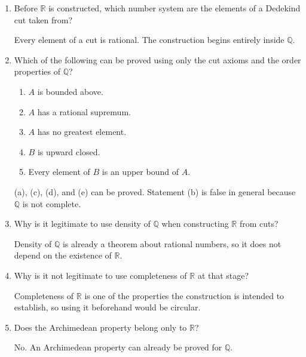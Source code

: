 \documentclass{self-check}
\begin{document}
\begin{enumerate}[label=\arabic*., itemsep=10pt]

\item Before $\mathbb{R}$ is constructed, which number system are the elements of a Dedekind cut taken from?

\begin{answer}
Every element of a cut is rational. The construction begins entirely inside $\mathbb{Q}$.
\end{answer}

\item Which of the following can be proved using only the cut axioms and the order properties of $\mathbb{Q}$?
\begin{enumerate}[label=(\alph*)]
\item $A$ is bounded above.
\item $A$ has a rational supremum.
\item $A$ has no greatest element.
\item $B$ is upward closed.
\item Every element of $B$ is an upper bound of $A$.
\end{enumerate}

\begin{answer}
(a), (c), (d), and (e) can be proved. Statement (b) is false in general because $\mathbb{Q}$ is not complete.
\end{answer}

\item Why is it legitimate to use density of $\mathbb{Q}$ when constructing $\mathbb{R}$ from cuts?

\begin{answer}
Density of $\mathbb{Q}$ is already a theorem about rational numbers, so it does not depend on the existence of $\mathbb{R}$.
\end{answer}

\item Why is it not legitimate to use completeness of $\mathbb{R}$ at that stage?

\begin{answer}
Completeness of $\mathbb{R}$ is one of the properties the construction is intended to establish, so using it beforehand would be circular.
\end{answer}

\item Does the Archimedean property belong only to $\mathbb{R}$?

\begin{answer}
No. An Archimedean property can already be proved for $\mathbb{Q}$.
\end{answer}


\end{enumerate}
\end{document}
